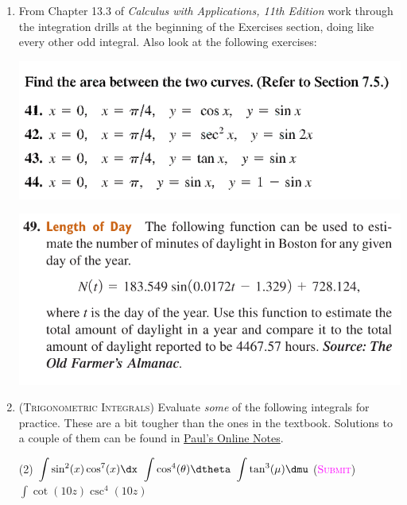 \begin{enumerate}
    \item %
        From Chapter 13.3 of \emph{Calculus with Applications, 11th Edition}
        work through the integration drills 
        at the beginning of the Exercises section,
        doing like every other odd integral.
        Also look at the following exercises:
        \begin{center}
            \includegraphics[width=\textwidth]{screenshots/41.png}
        \end{center}
        \begin{center}
            \includegraphics[width=\textwidth]{screenshots/49again.png}
        \end{center}

    \item 
        (\textsc{Trigonometric Integrals})
        Evaluate \emph{some} of the following integrals for practice.
        These are a bit tougher than the ones in the textbook.
        Solutions to a couple of them can be found in 
        \href{http://tutorial.math.lamar.edu/Problems/CalcII/IntegralsWithTrig.aspx}%
        {Paul's Online Notes}.
        \begin{tasks}[after-item-skip=2ex](2)
            \task $\displaystyle\int \sin^2(x)\cos^7(x)\dx$
            \task $\displaystyle\int \cos^4(\theta) \dtheta$
            \task $\displaystyle\int \tan^3(\mu)\dmu$ 
            (\textsc{\textcolor{magenta}{Submit}})
            \task $\displaystyle\int \cot(10z)\csc^4(10z)$
        \end{tasks}


\end{enumerate}

